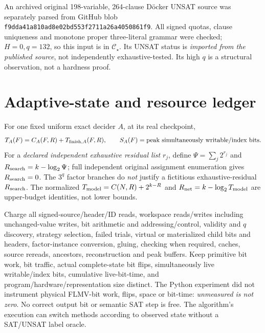 \documentclass[11pt]{article}
\newcommand{\CS}{\mathcal C_{\star}}
\begin{document}
An archived original 198-variable, 264-clause D\"ocker UNSAT source was separately parsed from GitHub blob \texttt{f9dda41a810ad8e02bd553f2711a26a4050861f9}. All signed quotas, clause uniqueness and monotone proper three-literal grammar were checked; $H=0,q=132$, so this input is in $\CS$. Its UNSAT status is \emph{imported from the published source}, not independently exhaustive-tested. Its high $q$ is a structural observation, not a hardness proof.

\section{Adaptive-state and resource ledger}
For one fixed uniform exact decider $A$, at its real checkpoint,
\[
T_A(F)=C_A(F,R)+T_{{\rm finish},A}(F,R),\qquad
S_A(F)=\hbox{peak simultaneously writable/index bits}.
\]
For a \emph{declared independent exhaustive residual list} $r_j$, define
$\Psi=\sum_j2^{r_j}$ and $R_{\rm search}=k-\log_2\Psi$; full independent original assignment enumeration gives $R_{\rm search}=0$. The $3^q$ factor branches do \emph{not} justify a fictitious exhaustive-residual $R_{\rm search}$. The normalized $T_{\rm model}=C(N,R)+2^{k-R}$ and $R_{\rm net}=k-\log_2T_{\rm model}$ are upper-budget identities, not lower bounds.

Charge all signed-source/header/ID reads, workspace reads/writes including unchanged-value writes, bit arithmetic and addressing/control, validity and $q$ discovery, strategy selection, failed trials, virtual or materialized child bits and headers, factor-instance conversion, gluing, checking when required, caches, source rereads, ancestors, reconstruction and peak buffers. Keep primitive bit work, bit traffic, actual complete-state bit flips, simultaneously live writable/index bits, cumulative live-bit-time, and program/hardware/representation size distinct. The Python experiment did not instrument physical FLMV-bit work, flips, space or bit-time: \emph{unmeasured is not zero}. No correct output bit or semantic SAT step is free. The algorithm's execution can switch methods according to observed state without a SAT/UNSAT label oracle.
\end{document}
